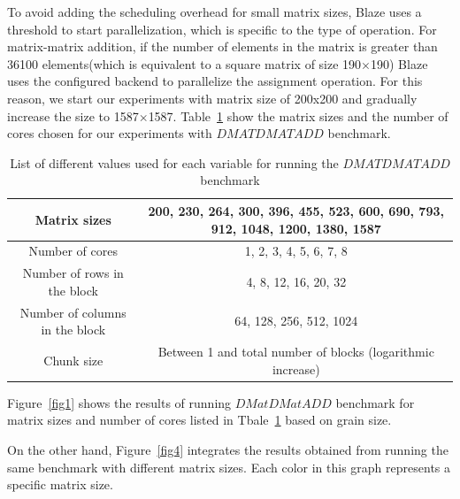 To avoid adding the scheduling overhead for small matrix sizes, Blaze uses a threshold to start parallelization, which is specific to the type of operation. For matrix-matrix addition, if the number of elements in the matrix is greater than 36100 elements(which is equivalent to a square matrix of size 190$\times$190) Blaze uses the configured backend to parallelize the assignment operation. For this reason, we start our experiments with matrix size of 200x200 and gradually increase the size to 1587$\times$1587. 
Table~\ref{table1} show the matrix sizes and the number of cores chosen for our experiments with $DMATDMATADD$ benchmark.

\vspace{\baselineskip}	
\begin{table}[H]
	\centering
		\resizebox{\textwidth}{!}
		{\begin{tabular}{|c | c |} 
			\hline
			Matrix sizes & 200, 230, 264, 300, 396, 455, 523, 600, 690, 793, 912, 1048, 1200, 1380, 1587 \\ [0.5ex] 
			\hline
			Number of cores & 1, 2, 3, 4, 5, 6, 7, 8 \\ 	
			\hline
			Number of rows in the block & 4, 8, 12, 16, 20, 32 \\
			\hline	
			Number of columns in the block & 64, 128, 256, 512, 1024 \\
			\hline
			Chunk size & Between 1 and total number of blocks (logarithmic increase)\\\hline
		\end{tabular}}

		\caption{List of different values used for each variable for running the $DMATDMATADD$ benchmark}
		\label{table1}
\end{table}

\vspace{\baselineskip}	
Figure~\ref{fig1} shows the results of running $DMatDMatADD$ benchmark for matrix sizes and number of cores listed in Tbale~\ref{table1} based on grain size. 

On the other hand, Figure~\ref{fig4} integrates the results obtained from running the same benchmark with different matrix sizes. Each color in this graph represents a specific matrix size. 

